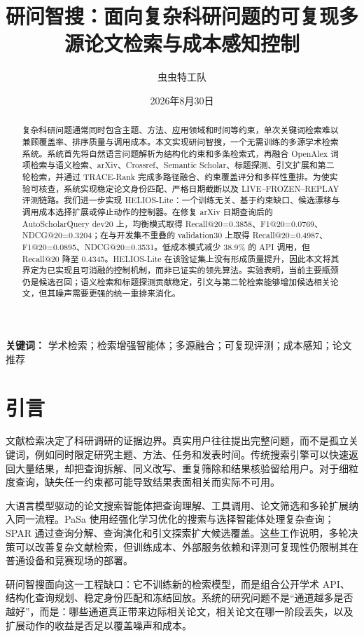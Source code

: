 \documentclass[a4paper,11pt]{ctexart}
\title{研问智搜：面向复杂科研问题的可复现多源论文检索与成本感知控制}
\author{虫虫特工队}
\date{2026年8月30日}
\begin{document}
\maketitle

\begin{abstract}
复杂科研问题通常同时包含主题、方法、应用领域和时间等约束，单次关键词检索难以兼顾覆盖率、排序质量与调用成本。本文实现研问智搜，一个无需训练的多源学术检索系统。系统首先将自然语言问题解析为结构化约束和多条检索式，再融合 OpenAlex 词项检索与语义检索、arXiv、Crossref、Semantic Scholar、标题探测、引文扩展和第二轮检索，并通过 TRACE-Rank 完成多路径融合、约束覆盖评分和多样性重排。为使实验可核查，系统实现稳定论文身份匹配、严格日期截断以及 LIVE--FROZEN--REPLAY 评测链路。我们进一步实现 HELIOS-Lite：一个训练无关、基于约束缺口、候选漂移与调用成本选择扩展或停止动作的控制器。在修复 arXiv 日期查询后的 AutoScholarQuery dev20 上，均衡模式取得 Recall@20=0.3858、F1@20=0.0769、NDCG@20=0.3204；在与开发集不重叠的 validation30 上取得 Recall@20=0.4987、F1@20=0.0895、NDCG@20=0.3531。低成本模式减少 38.9\% 的 API 调用，但 Recall@20 降至 0.4345。HELIOS-Lite 在该验证集上没有形成质量提升，因此本文将其界定为已实现且可消融的控制机制，而非已证实的领先算法。实验表明，当前主要瓶颈仍是候选召回；语义检索和标题探测贡献稳定，引文与第二轮检索能够增加候选相关论文，但其噪声需要更强的统一重排来消化。
\end{abstract}

\noindent\textbf{关键词：} 学术检索；检索增强智能体；多源融合；可复现评测；成本感知；论文推荐

\section{引言}
文献检索决定了科研调研的证据边界。真实用户往往提出完整问题，而不是孤立关键词，例如同时限定研究主题、方法、任务和发表时间。传统搜索引擎可以快速返回大量结果，却把查询拆解、同义改写、重复筛除和结果核验留给用户。对于细粒度查询，缺失任一约束都可能导致结果表面相关而实际不可用。

大语言模型驱动的论文搜索智能体把查询理解、工具调用、论文筛选和多轮扩展纳入同一流程。PaSa 使用经强化学习优化的搜索与选择智能体处理复杂查询；SPAR 通过查询分解、查询演化和引文探索扩大候选覆盖。这些工作说明，多轮决策可以改善复杂文献检索，但训练成本、外部服务依赖和评测可复现性仍限制其在普通设备和竞赛现场的部署。

研问智搜面向这一工程缺口：它不训练新的检索模型，而是组合公开学术 API、结构化查询规划、稳定身份匹配和冻结回放。系统的研究问题不是“通道越多是否越好”，而是：哪些通道真正带来边际相关论文，相关论文在哪一阶段丢失，以及扩展动作的收益是否足以覆盖噪声和成本。
\end{document}

